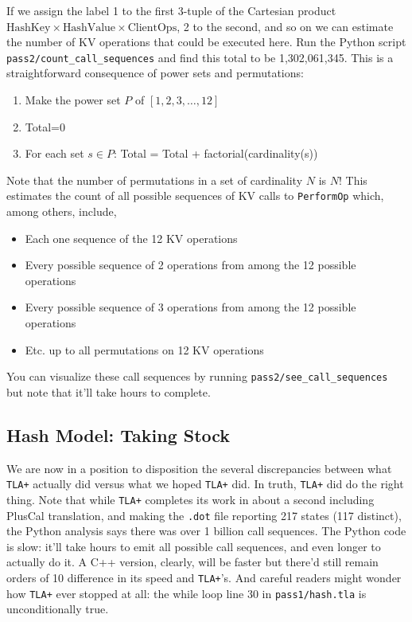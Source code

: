 \documentclass[twocolumn]{article}
\begin{document}
If we assign the label 1 to the first 3-tuple of the Cartesian product $\text{HashKey} \times \text{HashValue} \times \text{ClientOps}$, 2 to the second, and so on we can estimate the number of KV operations that could be executed here. Run the Python script \texttt{pass2/count\_call\_sequences} and find this total to be 1,302,061,345. This is a straightforward consequence of power sets and permutations:

\begin{enumerate}
\item Make the power set $P$ of $[1,2,3,\ldots,12]$
\item Total=0
\item For each set $s \in P$: Total = Total + factorial(cardinality(s))
\end{enumerate}

Note that the number of permutations in a set of cardinality $N$ is $N!$ This estimates the count of all possible sequences of KV calls to \texttt{PerformOp} which, among others, include,

\begin{itemize}
\item Each one sequence of the 12 KV operations
\item Every possible sequence of 2 operations from among the 12 possible operations
\item Every possible sequence of 3 operations from among the 12 possible operations
\item Etc. up to all permutations on 12 KV operations
\end{itemize}

\noindent You can visualize these call sequences by running \texttt{pass2/see\_call\_sequences} but note that it'll take hours to complete.

\subsection{Hash Model: Taking Stock}

We are now in a position to disposition the several discrepancies between what \texttt{TLA+} actually did versus what we hoped \texttt{TLA+} did. In truth, \texttt{TLA+} did do the right thing. Note that while \texttt{TLA+} completes its work in about a second including PlusCal translation, and making the \texttt{.dot} file reporting 217 states (117 distinct), the Python analysis says there was over 1 billion call sequences. The Python code is slow: it'll take hours to emit all possible call sequences, and even longer to actually do it. A C++ version, clearly, will be faster but there'd still remain orders of 10 difference in its speed and \texttt{TLA+}'s. And careful readers might wonder how \texttt{TLA+} ever stopped at all: the while loop line 30 in \texttt{pass1/hash.tla} is unconditionally true.
\end{document}
